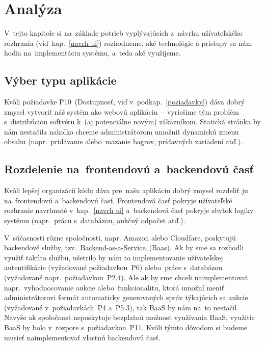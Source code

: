 \chapter{Analýza}

V~tejto kapitole si na~základe potrieb vyplývajúcich z~návrhu užívateľského rozhrania (viď~kap.~\ref{navrh ui}) rozhodneme, aké technológie a prístupy sa nám hodia na~implementáciu systému, a~teda aké využijeme.

\section{Výber typu aplikácie}

Kvôli požiadavke P10~(Dostupnosť, viď v~podkap.~\ref{poziadavky}) dáva dobrý zmysel vytvoriť náš systém ako webovú aplikáciu~-- vyriešime tým problém s~distribúciou softvéru k~(aj potenciálne novým) zákazníkom. Statická stránka by nám nestačila nakoľko chceme administrátorom umožniť dynamickú zmenu obsahu (napr.~pridávanie alebo~mazanie bagrov, prídavných zariadení atď.).

\section{Rozdelenie na~frontendovú a~backendovú časť}
\label{rozdelenie na frontendovu a backendovu cast}

Kvôli lepšej organizácií kódu dáva pre~našu aplikáciu dobrý zmysel rozdeliť ju na~frontendovú a~backendovú časť. Frontendová časť pokryje užívateľské rozhranie navrhnuté v~kap.~\ref{navrh ui} a~backendová časť pokryje zbytok logiky systému (napr.~prácu s~databázou, aukčný odpočet atď.).

V~súčasnosti rôzne spoločnosti, napr. Amazon alebo Cloudfare, poskytujú backendové služby, tzv.~\href{https://www.cloudflare.com/en-gb/learning/serverless/glossary/backend-as-a-service-baas/}{Backend-as-a-Service~(Baas)}. Ak by sme sa rozhodli využiť takúto službu, ušetrilo by nám to implementovanie užívateľskej autentifikácie (vyžadované požiadavkou~P6) alebo~práce s~databázou (vyžadované napr.~požiadavkou~P2.4). Ale ak by sme chceli naimplementovať napr.~vyhodnocovanie aukcie alebo~funkcionalitu, ktorá umožní meniť administrátorovi formát automaticky generovaných správ týkajúcich sa aukcie (vyžadované v~požiadavkách~P4 a~P5.3), tak BaaS by nám na~to nestačil. Navyše ak spoločnosť neposkytuje bezplatnú možnosť využívania BaaS, využitie BaaS by bolo v~rozpore s~požiadavkou~P11. Kvôli týmto dôvodom si budeme musieť naimplementovať vlastnú backendovú časť.

